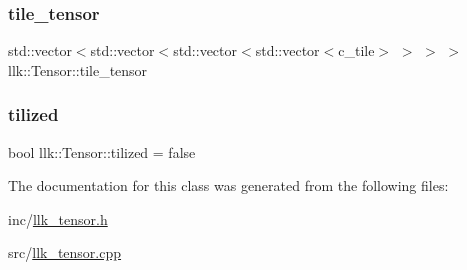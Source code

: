 \mbox{\label{classllk_1_1Tensor_ab4e13f105e99e94bf3c10be7d0447614}} 
\subsubsection{\texorpdfstring{tile\+\_\+tensor}{tile\_tensor}}
{\footnotesize\ttfamily std\+::vector$<$std\+::vector$<$std\+::vector$<$std\+::vector$<$c\+\_\+tile$>$ $>$ $>$ $>$ llk\+::\+Tensor\+::tile\+\_\+tensor}

\mbox{\label{classllk_1_1Tensor_ae083a87e42384c49611eeda3c551e620}} 
\subsubsection{\texorpdfstring{tilized}{tilized}}
{\footnotesize\ttfamily bool llk\+::\+Tensor\+::tilized = false}



The documentation for this class was generated from the following files\+:\begin{DoxyCompactItemize}
\item 
inc/\hyperlink{llk__tensor_8h}{llk\+\_\+tensor.\+h}\item 
src/\hyperlink{llk__tensor_8cpp}{llk\+\_\+tensor.\+cpp}\end{DoxyCompactItemize}
